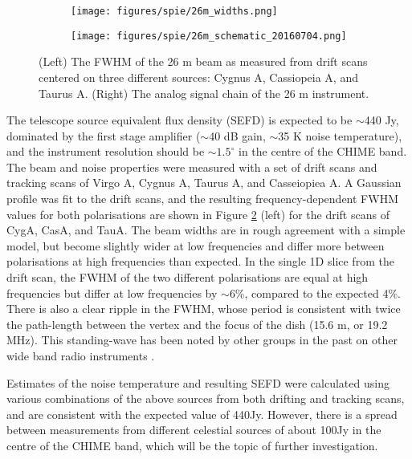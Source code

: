 \begin{figure}[h!] %
	\centering
	\begin{subfigure}[a]{0.42\textwidth}
		\vspace{-4in}
		\texttt{[image: figures/spie/26m\_widths.png]}%
	\end{subfigure}
	\begin{subfigure}[b]{0.56\textwidth}%
		\texttt{[image: figures/spie/26m\_schematic\_20160704.png]}%
		\label{signalchain}
	\end{subfigure}%
	\caption{(Left) The FWHM of the 26 m beam as measured from drift scans centered on three different sources: Cygnus A, Cassiopeia A, and Taurus A. (Right) The analog signal chain of the 26 m instrument.}
	\label{26mplot}
\end{figure}

The telescope source equivalent flux density (SEFD) is expected to be $\sim$440 Jy, dominated by the first stage amplifier ($\sim$40 dB gain, $\sim$35 K noise temperature), and the instrument resolution should be $\sim1.5^{\circ}$ in the centre of the CHIME band. The beam and noise properties were measured with a set of drift scans and tracking scans of Virgo A, Cygnus A, Taurus A, and Casseiopiea A. A Gaussian profile was fit to the drift scans, and the resulting frequency-dependent FWHM values for both polarisations are shown in Figure \ref{26mplot} (left) for the drift scans of CygA, CasA, and TauA. The beam widths are in rough agreement with a simple model, but become slightly wider at low frequencies and differ more between polarisations at high frequencies than expected. In the single 1D slice from the drift scan, the FWHM of the two different polarisations are equal at high frequencies but differ at low frequencies by $\sim$6\%, compared to the expected 4\%. There is also a clear ripple in the FWHM, whose period is consistent with twice the path-length between the vertex and the focus of the dish (15.6 m, or 19.2 MHz). This standing-wave has been noted by other groups in the past on other wide band radio instruments \citep{wander1, wander2}.

Estimates of the noise temperature and resulting SEFD were calculated using various combinations of the above sources from both drifting and tracking scans, and are consistent with the expected value of 440Jy. However, there is a spread between measurements from different celestial sources of about 100Jy in the centre of the CHIME band, which will be the topic of further investigation.

